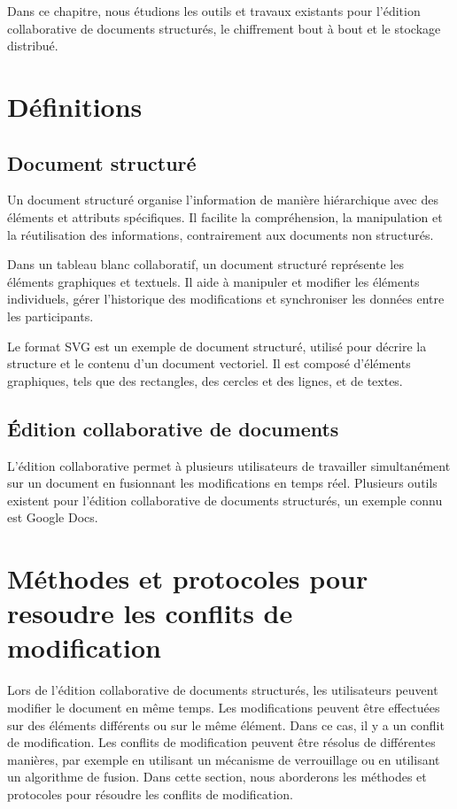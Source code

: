 Dans ce chapitre, nous étudions les outils et travaux existants pour l'édition collaborative de documents structurés, le chiffrement bout à bout et le stockage distribué.

\section{Définitions}
\subsection{Document structuré}
Un document structuré organise l'information de manière hiérarchique avec des éléments et attributs spécifiques. Il facilite la compréhension, la manipulation et la réutilisation des informations, contrairement aux documents non structurés.

Dans un tableau blanc collaboratif, un document structuré représente les éléments graphiques et textuels. Il aide à manipuler et modifier les éléments individuels, gérer l'historique des modifications et synchroniser les données entre les participants.

Le format SVG est un exemple de document structuré, utilisé pour décrire la structure et le contenu d'un document vectoriel. Il est composé d'éléments graphiques, tels que des rectangles, des cercles et des lignes, et de textes.

\subsection{Édition collaborative de documents}
L'édition collaborative permet à plusieurs utilisateurs de travailler simultanément sur un document en fusionnant les modifications en temps réel.
Plusieurs outils existent pour l'édition collaborative de documents structurés, un exemple connu est Google Docs.

\section{Méthodes et protocoles pour resoudre les conflits de modification}
Lors de l'édition collaborative de documents structurés, les utilisateurs peuvent modifier le document en même temps. Les modifications peuvent être effectuées sur des éléments différents ou sur le même élément. Dans ce cas, il y a un conflit de modification. Les conflits de modification peuvent être résolus de différentes manières, par exemple en utilisant un mécanisme de verrouillage ou en utilisant un algorithme de fusion. Dans cette section, nous aborderons les méthodes et protocoles pour résoudre les conflits de modification.

